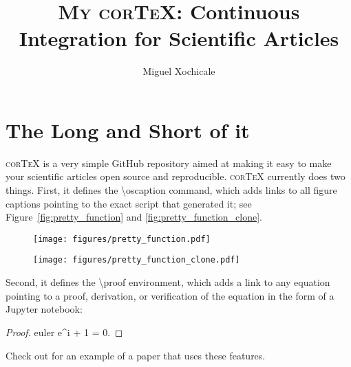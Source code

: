 \documentclass[modern]{aastex62}
\begin{document}
\title{\textsc{My corTeX}: Continuous Integration for Scientific Articles}

\author[0000-0002-8225-7517]{Miguel Xochicale}


\section{The Long and Short of it}
\label{sec:intro}
%
\textsc{corTeX} is a very simple \textsf{GitHub} repository aimed at making
it easy to make your scientific articles open source and reproducible.
\textsc{corTeX} currently does two things. First, it defines the
\textsf{\textbackslash oscaption} command, which adds
links to all figure captions pointing to the exact script that generated it;
see Figure~\ref{fig:pretty_function} and \ref{fig:pretty_function_clone}.
%
\begin{figure}[h!]
    \begin{centering}
    \texttt{[image: figures/pretty\_function.pdf]}
    \end{centering}
\end{figure}
%

\begin{figure}[h!]
    \begin{centering}
    \texttt{[image: figures/pretty\_function\_clone.pdf]}
    \end{centering}
\end{figure}
%


Second, it defines the \textsf{\textbackslash proof} environment, which
adds a link to any equation pointing to a proof, derivation, or
verification of the equation in the form of a \textsf{Jupyter} notebook:
%
\begin{proof}{euler}
    \label{eq:euler}
    e^{i\pi} + 1 = 0.
\end{proof}
%
Check out \citet{Luger2018} for an example of a paper that uses these
features.

\pagebreak

\end{document}
